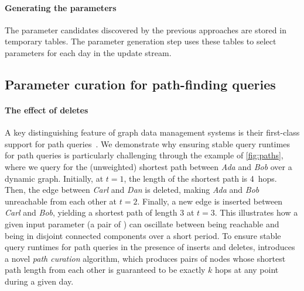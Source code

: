 \paragraph{Generating the parameters}
%
The parameter candidates discovered by the previous approaches are stored in temporary tables.
The parameter generation step uses these tables to select parameters for each day in the update stream.




\subsection{Parameter curation for path-finding queries}
\label{sec:path-curation}

\paragraph{The effect of deletes}
%
A key distinguishing feature of graph data management systems is their first-class support for path queries~\cite{DBLP:journals/csur/AnglesABHRV17}.
We demonstrate why ensuring stable query runtimes for path queries is particularly challenging through the example of \autoref{fig:paths}, where we query for the (unweighted) shortest path between \emph{Ada} and \emph{Bob} over a dynamic graph.
Initially, at $t = 1$, the length of the shortest path is 4~hops.
Then, the edge between \emph{Carl} and \emph{Dan} is deleted, making \emph{Ada} and \emph{Bob} unreachable from each other at $t = 2$.
Finally, a new edge is inserted between \emph{Carl} and \emph{Bob}, yielding a shortest path of length 3 at $t = 3$.
This illustrates how a given input parameter (a pair of \Persons) can oscillate between being reachable and being in disjoint connected components over a short period.
To ensure stable query runtimes for path queries in the presence of inserts and deletes, \interactivevtwo introduces a novel \emph{path curation} algorithm, which produces pairs of \Person nodes whose shortest path length from each other is guaranteed to be exactly $k$ hops at any point during a given day.

